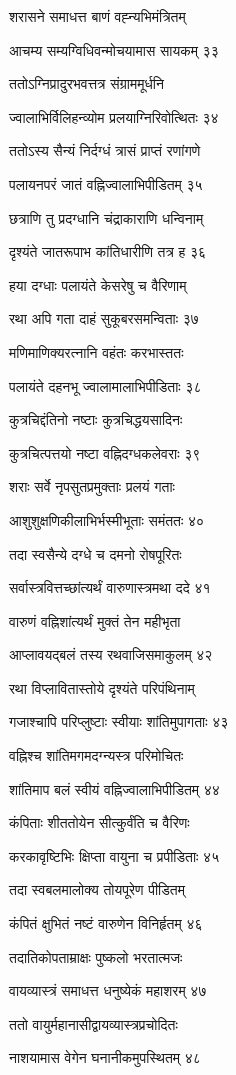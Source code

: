 शरासने समाधत्त बाणं वह्न्यभिमंत्रितम्

आचम्य सम्यग्विधिवन्मोचयामास सायकम् ३३

ततोऽग्निप्रादुरभवत्तत्र संग्राममूर्धनि

ज्वालाभिर्विलिहन्व्योम प्रलयाग्निरिवोत्थितः ३४

ततोऽस्य सैन्यं निर्दग्धं त्रासं प्राप्तं रणांगणे

पलायनपरं जातं वह्निज्वालाभिपीडितम् ३५

छत्राणि तु प्रदग्धानि चंद्राकाराणि धन्विनाम्

दृश्यंते जातरूपाभ कांतिधारीणि तत्र ह ३६

हया दग्धाः पलायंते केसरेषु च वैरिणाम्

रथा अपि गता दाहं सुकूबरसमन्विताः ३७

मणिमाणिक्यरत्नानि वहंतः करभास्ततः

पलायंते दहनभू ज्वालामालाभिपीडिताः ३८

कुत्रचिद्दंतिनो नष्टाः कुत्रचिद्धयसादिनः

कुत्रचित्पत्तयो नष्टा वह्निदग्धकलेवराः ३९

शराः सर्वे नृपसुतप्रमुक्ताः प्रलयं गताः

आशुशुक्षणिकीलाभिर्भस्मीभूताः समंततः ४०

तदा स्वसैन्ये दग्धे च दमनो रोषपूरितः

सर्वास्त्रवित्तच्छांत्यर्थं वारुणास्त्रमथा ददे ४१

वारुणं वह्निशांत्यर्थं मुक्तं तेन महीभृता

आप्लावयद्बलं तस्य रथवाजिसमाकुलम् ४२

रथा विप्लावितास्तोये दृश्यंते परिपंथिनाम्

गजाश्चापि परिप्लुष्टाः स्वीयाः शांतिमुपागताः ४३

वह्निश्च शांतिमगमदग्न्यस्त्र परिमोचितः

शांतिमाप बलं स्वीयं वह्निज्वालाभिपीडितम् ४४

कंपिताः शीततोयेन सीत्कुर्वंति च वैरिणः

करकावृष्टिभिः क्षिप्ता वायुना च प्रपीडिताः ४५

तदा स्वबलमालोक्य तोयपूरेण पीडितम्

कंपितं क्षुभितं नष्टं वारुणेन विनिर्हृतम् ४६

तदातिकोपताम्राक्षः पुष्कलो भरतात्मजः

वायव्यास्त्रं समाधत्त धनुष्येकं महाशरम् ४७

ततो वायुर्महानासीद्वायव्यास्त्रप्रचोदितः

नाशयामास वेगेन घनानीकमुपस्थितम् ४८

